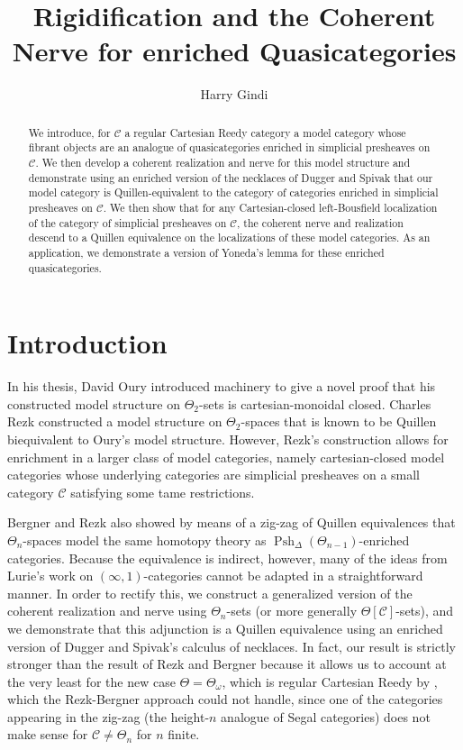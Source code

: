 \documentclass[leqno]{article}
\title{Rigidification and the Coherent Nerve for enriched Quasicategories}
\author{Harry Gindi}
\date{}
\numberwithin{equation}{subsection}
\theoremstyle{plain}   %
\theoremstyle{remark}
\theoremstyle{plain}
\DeclareMathOperator{\Psh}{Psh}
\newcommand{\C}{\ensuremath{\mathcal{C}}}
\begin{document}
\maketitle

\begin{abstract}
	We introduce, for \(\C\) a regular Cartesian Reedy category a model category whose fibrant objects are an analogue of quasicategories enriched in simplicial presheaves on \(\C\).  We then develop a coherent realization and nerve for this model structure and demonstrate using an enriched version of the necklaces of Dugger and Spivak that our model category is Quillen-equivalent to the category of categories enriched in simplicial presheaves on \(\C\).  We then show that for any Cartesian-closed left-Bousfield localization of the category of simplicial presheaves on \(\C\), the coherent nerve and realization descend to a Quillen equivalence on the localizations of these model categories. As an application, we demonstrate a version of Yoneda's lemma for these enriched quasicategories.
\end{abstract}

\tableofcontents






\section*{Introduction}
In his thesis, David Oury introduced machinery to give a novel proof that his constructed model structure on \(\Theta_2\)-sets is cartesian-monoidal closed. Charles Rezk constructed a model structure on \(\Theta_2\)-spaces that is known to be Quillen biequivalent to Oury's model structure.  However,  Rezk's construction allows for enrichment in a larger class of model categories, namely cartesian-closed model categories whose underlying categories are simplicial presheaves on a small category \(\C\) satisfying some tame restrictions.

Bergner and Rezk also showed by means of a zig-zag of Quillen equivalences that \(\Theta_n\)-spaces model the same homotopy theory as \(\Psh_\Delta(\Theta_{n-1})\)-enriched categories.  Because the equivalence is indirect, however, many of the ideas from Lurie's work on \((\infty,1)\)-categories cannot be adapted in a straightforward manner.  In order to rectify this, we construct a generalized version of the coherent realization and nerve using \(\Theta_n\)-sets (or more generally \(\Theta[\C]\)-sets), and we demonstrate that this adjunction is a Quillen equivalence using an enriched version of Dugger and Spivak's calculus of necklaces. In fact, our result is strictly stronger than the result of Rezk and Bergner because it allows us to account at the very least for the new case \(\Theta=\Theta_\omega\), which is regular Cartesian Reedy by \cite{berger-iterated-wreath}, which the Rezk-Bergner approach could not handle, since one of the categories appearing in the zig-zag (the height-\(n\) analogue of Segal categories) does not make sense for \(\C\neq \Theta_n\) for \(n\) finite.  
\end{document}
